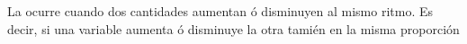 
\question La \fillin[P. Directa] ocurre cuando dos cantidades aumentan ó
          disminuyen al mismo ritmo. Es decir, si una variable aumenta ó
          disminuye la otra tamién en la misma proporción 

